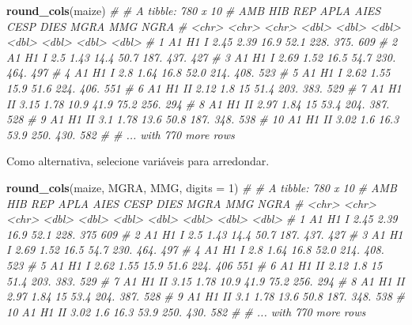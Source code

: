 \documentclass[
]{book}
\newenvironment{Shaded}{\begin{snugshade}}{\end{snugshade}}
\newcommand{\CommentTok}[1]{\textcolor[rgb]{0.56,0.35,0.01}{\textit{#1}}}
\newcommand{\DataTypeTok}[1]{\textcolor[rgb]{0.13,0.29,0.53}{#1}}
\newcommand{\DecValTok}[1]{\textcolor[rgb]{0.00,0.00,0.81}{#1}}
\newcommand{\KeywordTok}[1]{\textcolor[rgb]{0.13,0.29,0.53}{\textbf{#1}}}
\newcommand{\NormalTok}[1]{#1}
\begin{document}
\begin{Shaded}
\begin{Highlighting}[]
\KeywordTok{round_cols}\NormalTok{(maize)}
\CommentTok{# # A tibble: 780 x 10}
\CommentTok{#    AMB   HIB   REP    APLA  AIES  CESP  DIES  MGRA   MMG  NGRA}
\CommentTok{#    <chr> <chr> <chr> <dbl> <dbl> <dbl> <dbl> <dbl> <dbl> <dbl>}
\CommentTok{#  1 A1    H1    I      2.45  2.39  16.9  52.1 228.   375.   609}
\CommentTok{#  2 A1    H1    I      2.5   1.43  14.4  50.7 187.   437.   427}
\CommentTok{#  3 A1    H1    I      2.69  1.52  16.5  54.7 230.   464.   497}
\CommentTok{#  4 A1    H1    I      2.8   1.64  16.8  52.0 214.   408.   523}
\CommentTok{#  5 A1    H1    I      2.62  1.55  15.9  51.6 224.   406.   551}
\CommentTok{#  6 A1    H1    II     2.12  1.8   15    51.4 203.   383.   529}
\CommentTok{#  7 A1    H1    II     3.15  1.78  10.9  41.9  75.2  256.   294}
\CommentTok{#  8 A1    H1    II     2.97  1.84  15    53.4 204.   387.   528}
\CommentTok{#  9 A1    H1    II     3.1   1.78  13.6  50.8 187.   348.   538}
\CommentTok{# 10 A1    H1    II     3.02  1.6   16.3  53.9 250.   430.   582}
\CommentTok{# # ... with 770 more rows}
\end{Highlighting}
\end{Shaded}

Como alternativa, selecione variáveis para arredondar.

\begin{Shaded}
\begin{Highlighting}[]
\KeywordTok{round_cols}\NormalTok{(maize, MGRA, MMG, }\DataTypeTok{digits =} \DecValTok{1}\NormalTok{)}
\CommentTok{# # A tibble: 780 x 10}
\CommentTok{#    AMB   HIB   REP    APLA  AIES  CESP  DIES  MGRA   MMG  NGRA}
\CommentTok{#    <chr> <chr> <chr> <dbl> <dbl> <dbl> <dbl> <dbl> <dbl> <dbl>}
\CommentTok{#  1 A1    H1    I      2.45  2.39  16.9  52.1 228.   375    609}
\CommentTok{#  2 A1    H1    I      2.5   1.43  14.4  50.7 187.   437.   427}
\CommentTok{#  3 A1    H1    I      2.69  1.52  16.5  54.7 230.   464.   497}
\CommentTok{#  4 A1    H1    I      2.8   1.64  16.8  52.0 214.   408.   523}
\CommentTok{#  5 A1    H1    I      2.62  1.55  15.9  51.6 224.   406    551}
\CommentTok{#  6 A1    H1    II     2.12  1.8   15    51.4 203.   383.   529}
\CommentTok{#  7 A1    H1    II     3.15  1.78  10.9  41.9  75.2  256.   294}
\CommentTok{#  8 A1    H1    II     2.97  1.84  15    53.4 204.   387.   528}
\CommentTok{#  9 A1    H1    II     3.1   1.78  13.6  50.8 187.   348.   538}
\CommentTok{# 10 A1    H1    II     3.02  1.6   16.3  53.9 250.   430.   582}
\CommentTok{# # ... with 770 more rows}
\end{Highlighting}
\end{Shaded}
\end{document}
